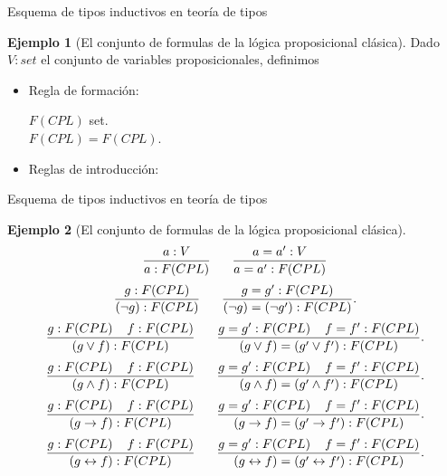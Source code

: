 \documentclass[dvipsnames, 8pt]{beamer} %
\theoremstyle{plain}
\theoremstyle{definition}
\newtheorem{ejemplo}{Ejemplo}
\begin{document}
\begin{frame}{Esquema de tipos inductivos en teoría de tipos}
    \begin{ejemplo}[El conjunto de formulas de la lógica proposicional clásica]
        Dado $V :set$ el conjunto de variables proposicionales, definimos\pause
        \begin{itemize}
            \item 
            Regla de formación:\pause
            \begin{center}
                $F(CPL)$ set.\\
                $F(CPL)=F(CPL)$.\pause
            \end{center}
            \item Reglas de introducción:
        \end{itemize}
    \end{ejemplo}
\end{frame}

\begin{frame}{Esquema de tipos inductivos en teoría de tipos}
    \begin{ejemplo}[El conjunto de formulas de la lógica proposicional clásica]
        $$\frac{a:V}{a:F(CPL)} \hspace{6mm} \frac{a=a':V}{a=a':F(CPL)}$$
        $$\frac{g:F(CPL)}{(\lnot g):F(CPL)} \hspace{6mm} \frac{g=g':F(CPL)}{(\lnot g)=(\lnot g'):F(CPL)}.$$
        $$\frac{g:F(CPL)\hspace{4mm}f:F(CPL)}{(g\lor f):F(CPL)} \hspace{6mm} \frac{g=g':F(CPL)\hspace{4mm}f=f':F(CPL)}{(g\lor f)=(g'\lor f'):F(CPL)}.$$
        $$\frac{g:F(CPL)\hspace{4mm}f:F(CPL)}{(g\land f):F(CPL)} \hspace{6mm} \frac{g=g':F(CPL)\hspace{4mm}f=f':F(CPL)}{(g\land f)=(g'\land f'):F(CPL)}.$$
        $$\frac{g:F(CPL)\hspace{4mm}f:F(CPL)}{(g\rightarrow f):F(CPL)} \hspace{6mm} \frac{g=g':F(CPL)\hspace{4mm}f=f':F(CPL)}{(g\rightarrow f)=(g'\rightarrow f'):F(CPL)}.$$
        $$\frac{g:F(CPL)\hspace{4mm}f:F(CPL)}{(g\leftrightarrow f):F(CPL)} \hspace{6mm} \frac{g=g':F(CPL)\hspace{4mm}f=f':F(CPL)}{(g\leftrightarrow f)=(g'\leftrightarrow f'):F(CPL)}.$$
    \end{ejemplo}
\end{frame}
\end{document}
